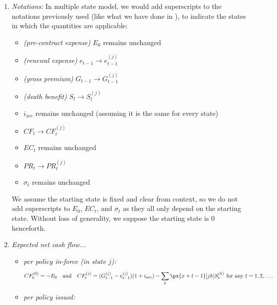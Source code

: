 \begin{enumerate}
\begin{enumerate}[label={(\arabic*)}]
\item \emph{Notations:} In multiple state model, we would add superscripts to
the notations previously used (like what we have done in
), to indicate the states in which the
quantities are applicable:
\begin{itemize}
\item \emph{(pre-contract expense)} \(E_0\) remains unchanged
\item \emph{(renewal expense)} \(e_{t-1}\to e_{t-1}^{(j)}\)
\item \emph{(gross premium)} \(G_{t-1}\to G_{t-1}^{(j)}\)
\item \emph{(death benefit)} \(S_t\to S_t^{(j)}\)
\item \(i_{\mathrm{acc}}\) remains unchanged (assuming it is the same for every state)
\item \(CF_{t}\to CF_{t}^{(j)}\)
\item \(EC_{t}\) remains unchanged
\item \(PR_{t}\to PR_{t}^{(j)}\)
\item \(\sigma_{t}\) remains unchanged
\end{itemize}
\begin{note}
We assume the starting state is fixed and clear from context, so we do not add
superscripts to \(E_0\), \(EC_{t}\), and \(\sigma_t\) as they all only depend
on the starting state. Without loss of generality, we suppose the starting
state is \(0\) henceforth.
\end{note}
\item \emph{Expected net cash flow...}
\begin{itemize}
\item \emph{per policy in-force (in state \(j\)):}
\[
CF_{0}^{(0)}=-E_0\qqtext{and}
CF_{t}^{(j)}=(G_{t-1}^{(j)}-e_{t-1}^{(j)})(1+i_{\mathrm{acc}})-\sum_{k}^{}\px{x+t-1}[jk]S_t^{(k)}\text{ for any \(t=1,2,\dotsc\)}.
\]
\begin{center}
\end{center}
\item \emph{per policy issued:}


\end{itemize}
\end{enumerate}
\end{enumerate}
